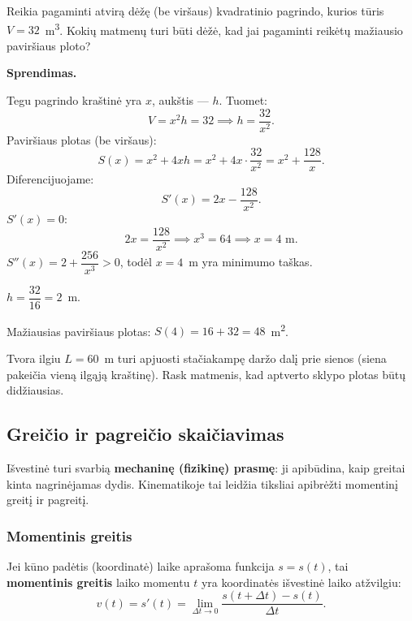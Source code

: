 \begin{example}
Reikia pagaminti atvirą dėžę (be viršaus) kvadratinio pagrindo, kurios tūris
$V = 32$~m\textsuperscript{3}. Kokių matmenų turi būti dėžė, kad jai pagaminti
reikėtų mažiausio paviršiaus ploto?

\textbf{Sprendimas.}

Tegu pagrindo kraštinė yra $x$, aukštis --- $h$. Tuomet:
\[
    V = x^2 h = 32 \implies h = \frac{32}{x^2}.
\]
Paviršiaus plotas (be viršaus):
\[
    S(x) = x^2 + 4xh = x^2 + 4x \cdot \frac{32}{x^2} = x^2 + \frac{128}{x}.
\]
Diferencijuojame:
\[
    S'(x) = 2x - \frac{128}{x^2}.
\]
$S'(x) = 0$:
\[
    2x = \frac{128}{x^2} \implies x^3 = 64 \implies x = 4 \text{ m}.
\]
$S''(x) = 2 + \dfrac{256}{x^3} > 0$, todėl $x = 4$~m yra minimumo taškas.

$h = \dfrac{32}{16} = 2$~m.

Mažiausias paviršiaus plotas: $S(4) = 16 + 32 = 48$~m\textsuperscript{2}.
\end{example}

\begin{exercise}
Tvora ilgiu $L = 60$~m turi apjuosti stačiakampę daržo dalį prie sienos (siena
pakeičia vieną ilgąją kraštinę). Rask matmenis, kad aptverto sklypo plotas būtų
didžiausias.
\end{exercise}

\subsection{Greičio ir pagreičio skaičiavimas}

Išvestinė turi svarbią \textbf{mechaninę (fizikinę) prasmę}: ji apibūdina, kaip
greitai kinta nagrinėjamas dydis. Kinematikoje tai leidžia tiksliai apibrėžti
momentinį greitį ir pagreitį.

\subsubsection*{Momentinis greitis}

\begin{definition}
Jei kūno padėtis (koordinatė) laike aprašoma funkcija $s = s(t)$, tai
\textbf{momentinis greitis} laiko momentu $t$ yra koordinatės išvestinė laiko
atžvilgiu:
\[
    v(t) = s'(t) = \lim_{\Delta t \to 0} \frac{s(t + \Delta t) - s(t)}{\Delta t}.
\]
\end{definition}


